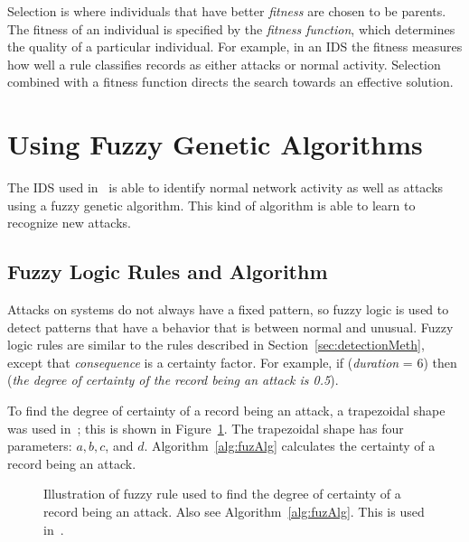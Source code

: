 \documentclass{sig-alternate}
\begin{document}
Selection is where individuals that have better \emph{fitness} are chosen to be parents. The fitness of an individual is specified by the \emph{fitness function}, which determines the quality of a particular individual. For example, in an IDS the fitness measures how well a rule classifies records as either attacks or normal activity. Selection combined with a fitness function directs the search towards an effective solution.~\cite{DBLP:journals/corr/abs-1204-6416}











\section{Using Fuzzy Genetic Algorithms}
\label{sec:fuzGenAlgImp}
The IDS used in~\cite{6496342, 6559603} is able to identify normal network activity as well as attacks using a fuzzy genetic algorithm. This kind of algorithm is able to learn to recognize new attacks.




\subsection{Fuzzy Logic Rules and Algorithm}
\label{sec:fuzzyRulesAndAlgorithm}
Attacks on systems do not always have a fixed pattern, so fuzzy logic is used to detect patterns that have a behavior that is between normal and unusual. Fuzzy logic rules are similar to the rules described in Section~\ref{sec:detectionMeth}, except that \emph{consequence} is a certainty factor. For example, if (\emph{duration} = 6) then (\emph{the degree of certainty of the record being an attack is 0.5}).

To find the degree of certainty of a record being an attack, a trapezoidal shape was used in~\cite{6496342, 6559603}; this is shown in Figure~\ref{fig:trapFigure}. The trapezoidal shape has four parameters: $a, b, c$, and $d$. Algorithm~\ref{alg:fuzAlg} calculates the certainty of a record being an attack.


\begin{figure}
\caption{Illustration of fuzzy rule used to find the degree of certainty of a record being an attack. Also see Algorithm~\ref{alg:fuzAlg}. This is used in~\cite{6496342, 6559603}.}
\centering
{}
\label{fig:trapFigure}
\end{figure}
\end{document}
